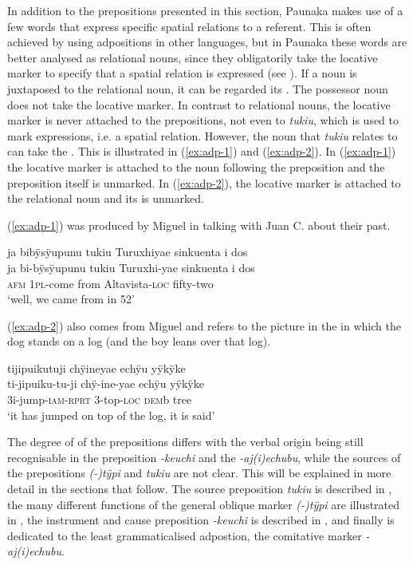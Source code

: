 In addition to the prepositions presented in this section, Paunaka makes use of a few words that express specific spatial relations to a referent. This is often achieved by using adpositions in other languages, but in Paunaka these words are better analysed as relational nouns, since they obligatorily take the locative marker to specify that a spatial relation is expressed (see ). If a noun is juxtaposed to the relational noun, it can be regarded its . The possessor noun does not take the locative marker. In contrast to relational nouns, the locative marker is never attached to the prepositions, not even to \textit{tukiu}, which is used to mark  expressions, i.e. a spatial relation. However, the noun that \textit{tukiu} relates to can take the . This is illustrated in (\ref{ex:adp-1}) and (\ref{ex:adp-2}). In (\ref{ex:adp-1}) the locative marker is attached to the noun following the preposition and the preposition itself is unmarked. In (\ref{ex:adp-2}), the locative marker is attached to the relational noun and its  is unmarked.

(\ref{ex:adp-1}) was produced by Miguel in talking with Juan C. about their past. 

\ea\label{ex:adp-1}
\begingl
\glpreamble ja bibÿsÿupunu tukiu Turuxhiyae sinkuenta i dos\\
\gla ja bi-bÿsÿupunu tukiu Turuxhi-yae {sinkuenta i dos}\\
\glb \textsc{afm} 1\textsc{pl}-come from Altavista-\textsc{loc} {fifty-two}\\
\glft ‘well, we came from  in 52’
\endgl
\trailingcitation{[mqx-p110826l.055]}
\xe

(\ref{ex:adp-2}) also comes from Miguel and refers to the picture in the  in which the dog stands on a log (and the boy leans over that log).

\ea\label{ex:adp-2}
\begingl
\glpreamble tijipuikutuji chÿineyae echÿu yÿkÿke\\
\gla ti-jipuiku-tu-ji chÿ-ine-yae echÿu yÿkÿke\\
\glb 3i-jump-\textsc{iam}-\textsc{rprt} 3-top-\textsc{loc} \textsc{dem}b tree\\
\glft ‘it has jumped on top of the log, it is said’
\endgl
\trailingcitation{[mtx-a110906l.207]}
\xe


The degree of  of the prepositions differs with the verbal origin being still recognisable in the  preposition \textit{-keuchi} and the  \textit{-aj(i)echubu}, while the sources of the prepositions \textit{(-)tÿpi} and \textit{tukiu} are not clear. This will be explained in more detail in the sections that follow. The source preposition \textit{tukiu} is described in , the many different functions of the general oblique marker \textit{(-)tÿpi} are illustrated in , the instrument and cause preposition \textit{-keuchi} is described in , and finally  is dedicated to the least grammaticalised adpostion, the comitative marker \textit{-aj(i)echubu}.

